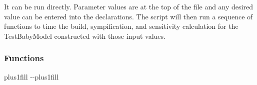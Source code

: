 \documentclass[letterpaper,10pt,english]{sphinxmanual}
\begin{document}
\sphinxAtStartPar
It can be run directly. Parameter values are at the top of the file and any desired value can be entered into the declarations.
The script will then run a sequence of functions to time the build, sympification, and sensitivity calculation for the TestBabyModel
constructed with those input values.
\subsubsection*{Functions}


\begin{savenotes}
\sphinxatlongtablestart
\sphinxthistablewithglobalstyle
\sphinxthistablewithnovlinesstyle
\makeatletter
  \LTleft \@totalleftmargin plus1fill
  \LTright\dimexpr\columnwidth-\@totalleftmargin-\linewidth\relax plus1fill
\makeatother
\begin{longtable}{}
\sphinxtoprule
\endfirsthead

\\
\sphinxtoprule
\endhead

\sphinxbottomrule
{}\\
\endfoot

\endlastfoot
\sphinxtableatstartofbodyhook


\end{longtable}
\end{savenotes}
\end{document}
